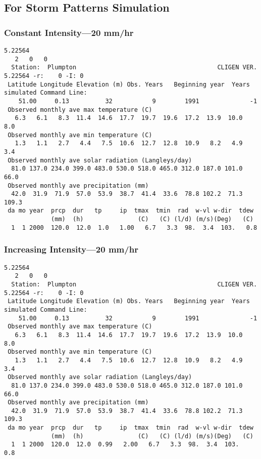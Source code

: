 \subsection{For Storm Patterns Simulation}
\label{sec:ForIntraStormPatternsSimulation}

\subsubsection{Constant Intensity---20 mm/hr}
\label{sec:ConstantIntensity20MmHr}

\begin{verbatim}
5.22564
   2   0   0
  Station:  Plumpton                                       CLIGEN VER. 5.22564 -r:    0 -I: 0
 Latitude Longitude Elevation (m) Obs. Years   Beginning year  Years simulated Command Line:
    51.00     0.13          32           9        1991              -1
 Observed monthly ave max temperature (C)
   6.3   6.1   8.3  11.4  14.6  17.7  19.7  19.6  17.2  13.9  10.0   8.0
 Observed monthly ave min temperature (C)
   1.3   1.1   2.7   4.4   7.5  10.6  12.7  12.8  10.9   8.2   4.9   3.4
 Observed monthly ave solar radiation (Langleys/day)
  81.0 137.0 234.0 399.0 483.0 530.0 518.0 465.0 312.0 187.0 101.0  66.0
 Observed monthly ave precipitation (mm)
  42.0  31.9  71.9  57.0  53.9  38.7  41.4  33.6  78.8 102.2  71.3 109.3
 da mo year  prcp  dur   tp     ip  tmax  tmin  rad  w-vl w-dir  tdew
             (mm)  (h)               (C)   (C) (l/d) (m/s)(Deg)   (C)
  1  1 2000  120.0  12.0  1.0   1.00   6.7   3.3  98.  3.4  103.   0.8
\end{verbatim}

\subsubsection{Increasing Intensity---20 mm/hr}
\label{sec:IncreasingIntensity20MmHr}

\begin{verbatim}
5.22564
   2   0   0
  Station:  Plumpton                                       CLIGEN VER. 5.22564 -r:    0 -I: 0
 Latitude Longitude Elevation (m) Obs. Years   Beginning year  Years simulated Command Line:
    51.00     0.13          32           9        1991              -1
 Observed monthly ave max temperature (C)
   6.3   6.1   8.3  11.4  14.6  17.7  19.7  19.6  17.2  13.9  10.0   8.0
 Observed monthly ave min temperature (C)
   1.3   1.1   2.7   4.4   7.5  10.6  12.7  12.8  10.9   8.2   4.9   3.4
 Observed monthly ave solar radiation (Langleys/day)
  81.0 137.0 234.0 399.0 483.0 530.0 518.0 465.0 312.0 187.0 101.0  66.0
 Observed monthly ave precipitation (mm)
  42.0  31.9  71.9  57.0  53.9  38.7  41.4  33.6  78.8 102.2  71.3 109.3
 da mo year  prcp  dur   tp     ip  tmax  tmin  rad  w-vl w-dir  tdew
             (mm)  (h)               (C)   (C) (l/d) (m/s)(Deg)   (C)
  1  1 2000  120.0  12.0  0.99   2.00   6.7   3.3  98.  3.4  103.   0.8
\end{verbatim}


